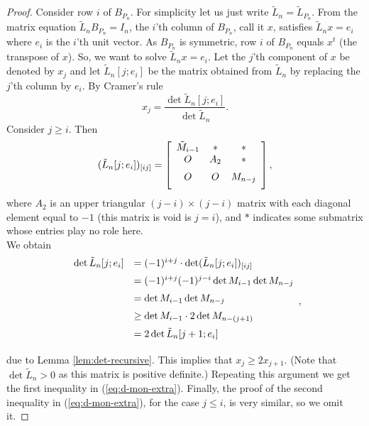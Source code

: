 \documentclass[12pt]{article}
\begin{document}
\begin{proof}
 Consider row $i$ of $B_{P_n}$. For simplicity let us just write $\tilde{L}_n=\tilde{L}_{P_n}$. From the matrix equation $\tilde{L}_{n} B_{P_n}=I_n$, the $i$'th column of $B_{P_n}$, call it $x$, satisfies $\tilde{L}_n x=e_i$ where $e_i$ is the $i$'th unit vector. As $B_{P_n}$ is symmetric, row $i$ of $B_{P_n}$ equals $x^t$ (the transpose of $x$). So, we want to solve  $\tilde{L}_n x=e_i$. Let the $j$'th component of $x$ be denoted by $x_j$ and let $\tilde{L}_n[j;e_i]$ be the matrix obtained from $\tilde{L}_n$ by replacing the $j$'th column by $e_i$.  By Cramer's rule
 \[
      x_j=\frac{\det \tilde{L}_n[j;e_i]}{\det \tilde{L}_n}.
 \]
Consider $j \geq i$. Then 
%
\[
(\tilde{L}_n[j;e_i])_{[ij]}=
\left[
\begin{array}{ccc}
\tilde{M}_{i-1} & * & * \\ \vspace{0.2cm}
 O    & A_2 & * \\ \vspace{0.2cm}
 O    & O & M_{n-j}
\end{array}
\right],
\]
where $A_2$ is an upper triangular $(j-i) \times (j-i)$  matrix with each diagonal element equal to $-1$ (this matrix is void is $j=i$), and $*$ indicates some submatrix whose entries play no role here. \\

%

We obtain
\[
 \begin{array}{ll} \vspace{0.2cm}
   \det \tilde{L}_n[j;e_i] &= 
   (-1)^{i+j} \cdot \det (\tilde{L}_n[j;e_i])_{[ij]} \\ \vspace{0.2cm}
   &=(-1)^{i+j} (-1)^{j-i} \det M_{i-1}   \det M_{n-j} \\ \vspace{0.2cm}
   &= \det M_{i-1}   \det M_{n-j} \\ \vspace{0.2cm}
   &\ge \det M_{i-1}  \cdot 2 \det M_{n-(j+1)} \\ \vspace{0.2cm}
   &=2\det \tilde{L}_n[j+1;e_i] 
 \end{array}, 
\]
due to Lemma \ref{lem:det-recursive}. This implies that $x_j\ge 2x_{j+1}$. (Note that $\det \tilde{L}_n>0$ as this matrix is positive definite.) Repeating this argument we get the first inequality in (\ref{eq:d-mon-extra}). 
  Finally,  the proof of the second inequality in (\ref{eq:d-mon-extra}), for the case  $j \le i$, is very similar, so we omit it. 
\end{proof}
\end{document}
